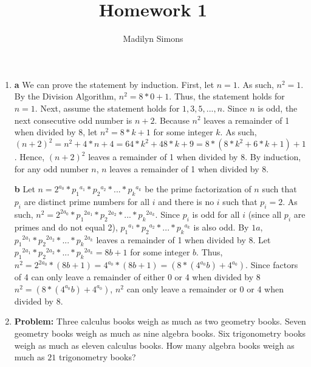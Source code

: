 \documentclass{article}
\title{Homework 1}
\author{Madilyn Simons}
\date{}
\begin{document}
\maketitle

\begin{enumerate}

\item \textbf{a} We can prove the statement by induction.  First, let $n = 1$.  As such, $n^2 = 1$.  By the Division Algorithm, $n^2 = 8*0 + 1$.  Thus, the statement holds for $n = 1$.  Next, assume the statement holds for $1, 3, 5, ..., n$.  Since $n$ is odd, the next consecutive odd number is $n+2$.  Because $n^2$ leaves a remainder of 1 when divided by 8, let $n^2 = 8*k + 1$ for some integer $k$.  As such, $(n+2)^2 = n^2 + 4*n + 4 = 64*k^2 + 48*k + 9 = 8 * (8*k^2 + 6*k + 1) + 1$.  Hence, $(n+2)^2$ leaves a remainder of 1 when divided by 8.  By induction, for any odd number $n$, $n$ leaves a remainder of 1 when divided by 8.

\textbf{b} Let $n = 2^{a_0} * {p_1}^{a_1} * {p_2}^{a_2} * ... * {p_k}^{a_k}$ be the prime factorization of $n$ such that $p_i$ are distinct prime numbers for all $i$ and there is no $i$ such that $p_i = 2$.  As such, $n^2 = 2^{2a_0} * {p_1}^{2a_1} * {p_2}^{2a_2} * ... * {p_k}^{2a_k}$.  Since $p_i$ is odd for all $i$ (since all $p_i$ are primes and do not equal 2), ${p_1}^{a_1} * {p_2}^{a_2} * ... * {p_k}^{a_k}$ is also odd.  By $1a$, ${p_1}^{2a_1} * {p_2}^{2a_2} * ... * {p_k}^{2a_k}$ leaves a remainder of 1 when divided by 8.  Let ${p_1}^{2a_1} * {p_2}^{2a_2} * ... * {p_k}^{2a_k} = 8b + 1$ for some integer $b$.  Thus, $n^2 = 2^{2a_0} * (8b + 1) = 4^{a_0} * (8b + 1) = (8 * (4^{a_0}b) + 4^{a_0}).$  Since factors of 4 can only leave a remainder of either 0 or 4 when divided by 8 $n^2 = (8 * (4^{a_0}b) + 4^{a_0})$, $n^2$ can only leave a remainder or 0 or 4 when divided by 8.

\item \textbf{Problem:} Three calculus books weigh as much as two geometry books.  Seven geometry books weigh as much as nine algebra books.  Six trigonometry books weigh as much as eleven calculus books.  How many algebra books weigh as much as $21$ trigonometry books? \\


\end{enumerate}
\end{document}
